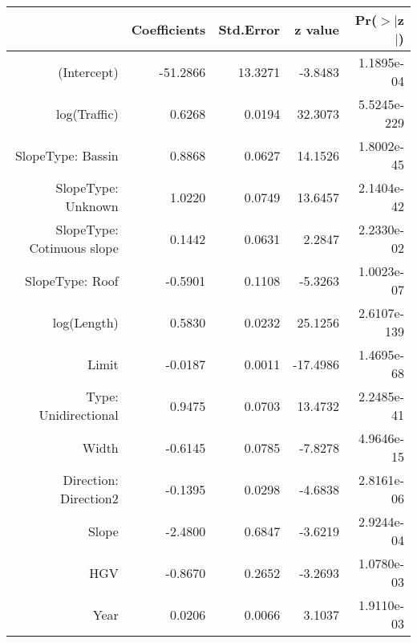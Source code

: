 \begin{table}[ht]
\centering
\begin{tabular}{rrrrr}
  \hline
 & Coefficients & Std.Error & z value & Pr($>$$|$z$|$) \\ 
  \hline
(Intercept) & -51.2866 & 13.3271 & -3.8483 & 1.1895e-04 \\ 
  log(Traffic) & 0.6268 & 0.0194 & 32.3073 & 5.5245e-229 \\ 
  SlopeType: Bassin & 0.8868 & 0.0627 & 14.1526 & 1.8002e-45 \\ 
  SlopeType: Unknown & 1.0220 & 0.0749 & 13.6457 & 2.1404e-42 \\ 
  SlopeType: Cotinuous slope & 0.1442 & 0.0631 & 2.2847 & 2.2330e-02 \\ 
  SlopeType: Roof & -0.5901 & 0.1108 & -5.3263 & 1.0023e-07 \\ 
  log(Length) & 0.5830 & 0.0232 & 25.1256 & 2.6107e-139 \\ 
  Limit & -0.0187 & 0.0011 & -17.4986 & 1.4695e-68 \\ 
  Type: Unidirectional & 0.9475 & 0.0703 & 13.4732 & 2.2485e-41 \\ 
  Width & -0.6145 & 0.0785 & -7.8278 & 4.9646e-15 \\ 
  Direction: Direction2 & -0.1395 & 0.0298 & -4.6838 & 2.8161e-06 \\ 
  Slope & -2.4800 & 0.6847 & -3.6219 & 2.9244e-04 \\ 
  HGV & -0.8670 & 0.2652 & -3.2693 & 1.0780e-03 \\ 
  Year & 0.0206 & 0.0066 & 3.1037 & 1.9110e-03 \\ 
   \hline
\end{tabular}
\end{table}
